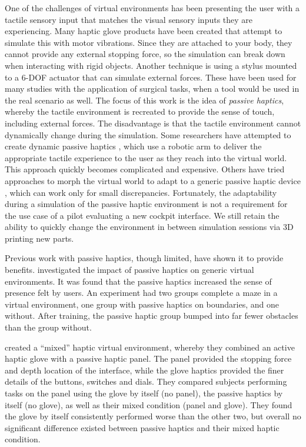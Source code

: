 One of the challenges of virtual environments has been presenting the user with a tactile sensory input that matches the visual sensory inputs they are experiencing.
Many haptic glove products have been created that attempt to simulate this with motor vibrations.
Since they are attached to your body, they cannot provide any external stopping force, so the simulation can break down when interacting with rigid objects.
Another technique is using a stylus mounted to a 6-DOF actuator that can simulate external forces.
These have been used for many studies with the application of surgical tasks, when a tool would be used in the real scenario as well.
The focus of this work is the idea of \emph{passive haptics}, whereby the tactile environment is recreated to provide the sense of touch, including external forces.
The disadvantage is that the tactile environment cannot dynamically change during the simulation.
Some researchers have attempted to create dynamic passive haptics \citep{mcneely_robotic_1993, tachi_construction_1994}, which use a robotic arm to deliver the appropriate tactile experience to the user as they reach into the virtual world.
This approach quickly becomes complicated and expensive.
Others have tried approaches to morph the virtual world to adapt to a generic passive haptic device \citep{kohli_exploiting_2009,kohli_redirected_2012}, which can work only for small discrepancies.
Fortunately, the adaptability during a simulation of the passive haptic environment is not a requirement for the use case of a pilot evaluating a new cockpit interface.
We still retain the ability to quickly change the environment in between simulation sessions via 3D printing new parts.

Previous work with passive haptics, though limited, have shown it to provide benefits.
\citet{insko_passive_2001} investigated the impact of passive haptics on generic virtual environments.
It was found that the passive haptics increased the sense of presence felt by users.
An experiment had two groups complete a maze in a virtual environment, one group with passive haptics on boundaries, and one without.
After training, the passive haptic group bumped into far fewer obstacles than the group without.

\citet{borst_evaluation_2005} created a ``mixed'' haptic virtual environment, whereby they combined an active haptic glove with a passive haptic panel.
The panel provided the stopping force and depth location of the interface, while the glove haptics provided the finer details of the buttons, switches and dials.
They compared subjects performing tasks on the panel using the glove by itself (no panel), the passive haptics by itself (no glove), as well as their mixed condition (panel and glove).
They found the glove by itself consistently performed worse than the other two, but overall no significant difference existed between passive haptics and their mixed haptic condition.

